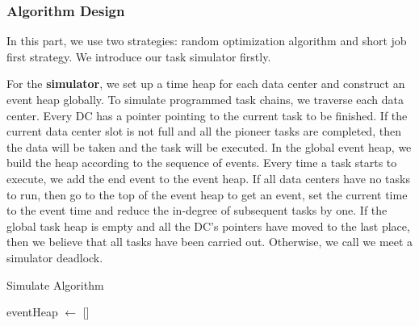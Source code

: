 \documentclass{llncs}
\begin{document}
\subsubsection{Algorithm Design}
In this part, we use two strategies: random optimization algorithm and short job first strategy. We introduce our task simulator firstly. 

For the \textbf{simulator}, we set up a time heap for each data center and construct an event heap globally. To simulate programmed task chains, we traverse each data center. Every DC has a pointer pointing to the current task to be finished. If the current data center slot is not full and all the pioneer tasks are completed, then the data will be taken and the task will be executed. In the global event heap, we build the heap according to the sequence of events. Every time a task starts to execute, we add the end event to the event heap. If all data centers have no tasks to run, then go to the top of the event heap to get an event, set the current time to the event time and reduce the in-degree of subsequent tasks by one. If the global task heap is empty and all the DC's pointers have moved to the last place, then we believe that all tasks have been carried out. Otherwise, we call we meet a simulator deadlock.

\begin{algorithm}

\BlankLine
\caption{Simulate Algorithm}
\label{alg:simu}
\BlankLine
eventHeap $\leftarrow$ []

\end{algorithm}
\end{document}
